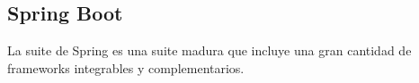 \subsection{Spring Boot}

\cite{springboot}

La suite de Spring es una suite madura que incluye una gran cantidad de frameworks integrables y complementarios.
\cite{springmicroservice}



